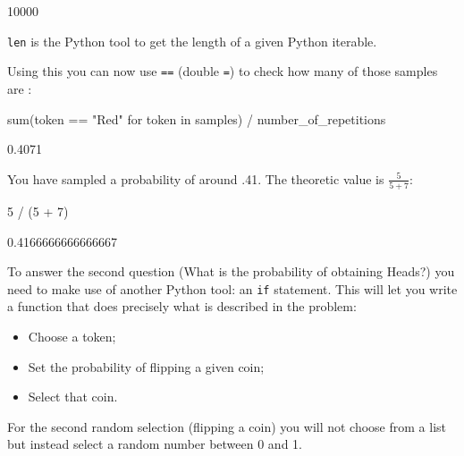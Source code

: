 \begin{raw}
10000
\end{raw}

\begin{note}
\texttt{len} is the Python tool to get the length of a given Python iterable.
\end{note}



Using this you can now use \texttt{==} (double \texttt{=}) to check how many of those 
samples are :

\begin{pyin}
sum(token == "Red" for token in samples) / number_of_repetitions
\end{pyin}

\begin{raw}
0.4071
\end{raw}

You have sampled a probability of around .41. The theoretic value is \(\frac{5}{5 +
7}\):


\begin{pyin}
5 / (5 + 7)
\end{pyin}





\begin{raw}
0.4166666666666667
\end{raw}






To answer the second question (What is the probability of obtaining Heads?) you
need to make use of another Python tool: an \texttt{if} statement. This will let
you
write a function that does precisely what is described in the problem:
\begin{itemize}
\item 

Choose a token;

\item 

Set the probability of flipping a given coin;

\item 

Select that coin.

\end{itemize}


\begin{note}
For the second random selection (flipping a coin) you will not choose from a list
but instead select a random number between 0 and 1.
\end{note}





